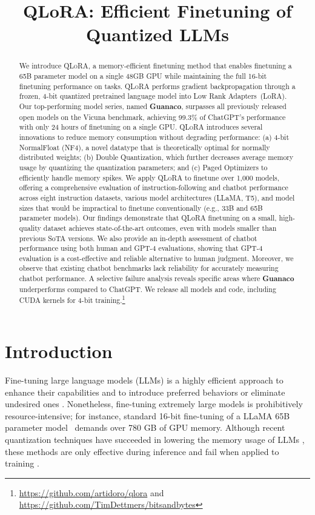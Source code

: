 \title{QLoRA: Efficient Finetuning of Quantized LLMs}

\begin{abstract}
We introduce \textsc{QLoRA}, a memory-efficient finetuning method that enables finetuning a 65B parameter model on a single 48GB GPU while maintaining the full 16-bit finetuning performance on tasks. \textsc{QLoRA} performs gradient backpropagation through a frozen, 4-bit quantized pretrained language model into Low Rank Adapters~(LoRA). Our top-performing model series, named \textbf{Guanaco}, surpasses all previously released open models on the Vicuna benchmark, achieving 99.3\% of ChatGPT's performance with only 24 hours of finetuning on a single GPU. \textsc{QLoRA} introduces several innovations to reduce memory consumption without degrading performance: (a) 4-bit NormalFloat (NF4), a novel datatype that is theoretically optimal for normally distributed weights; (b) Double Quantization, which further decreases average memory usage by quantizing the quantization parameters; and (c) Paged Optimizers to efficiently handle memory spikes. We apply \textsc{QLoRA} to finetune over 1,000 models, offering a comprehensive evaluation of instruction-following and chatbot performance across eight instruction datasets, various model architectures (LLaMA, T5), and model sizes that would be impractical to finetune conventionally (e.g., 33B and 65B parameter models). Our findings demonstrate that QLoRA finetuning on a small, high-quality dataset achieves state-of-the-art outcomes, even with models smaller than previous SoTA versions. We also provide an in-depth assessment of chatbot performance using both human and GPT-4 evaluations, showing that GPT-4 evaluation is a cost-effective and reliable alternative to human judgment. Moreover, we observe that existing chatbot benchmarks lack reliability for accurately measuring chatbot performance. A selective failure analysis reveals specific areas where \textbf{Guanaco} underperforms compared to ChatGPT. We release all models and code, including CUDA kernels for 4-bit training.\footnote{\url{https://github.com/artidoro/qlora} and \url{https://github.com/TimDettmers/bitsandbytes}}
\end{abstract}

\section{Introduction}

Fine-tuning large language models (LLMs) is a highly efficient approach to enhance their capabilities \citep{min2021metaicl, wei2021finetuned, ouyang2022training, wang2022super, wang2022self, liu2022few} and to introduce preferred behaviors or eliminate undesired ones \citep{ouyang2022training, askell2021general, bai2022training}. Nonetheless, fine-tuning extremely large models is prohibitively resource-intensive; for instance, standard 16-bit fine-tuning of a LLaMA 65B parameter model~\citep{touvron2023llama} demands over 780 GB of GPU memory. Although recent quantization techniques have succeeded in lowering the memory usage of LLMs \citep{dettmers2022llm, dettmers2022case, frantar2022gptq, xiao2022smoothquant}, these methods are only effective during inference and fail when applied to training \citep{wortsman2023stable}.

